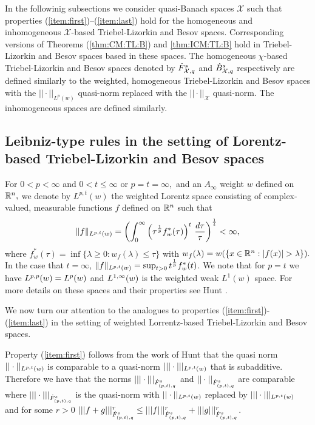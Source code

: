 {In the followinig subsections we consider quasi-Banach spaces $\mathcal{X}$ such that properties (\ref{item:first})--(\ref{item:last}) hold for the homogeneous and inhomogeneous $\mathcal{X}$-based Triebel-Lizorkin and Besov spaces. Corresponding versions of Theorems (\ref{thm:CM:TL:B}) and \ref{thm:ICM:TL:B} hold in Triebel-Lizorkin and Besov spaces based in these spaces. The homogeneous $\chi$-based Triebel-Lizorkin and Besov spaces denoted by $\tl{\mathcal{X}}{s}{q}$ and $\bes{\mathcal{X}}{s}{q}$ respectively are defined similarly to the weighted, homogeneous Triebel-Lizorkin and Besov spaces with the $||\cdot||_{L^p(w)}$ quasi-norm replaced with the $||\cdot||_\mathcal{X}$ quasi-norm. The inhomogeneous spaces are defined similarly. 

 \subsection{Leibniz-type rules in the setting of Lorentz-based Triebel-Lizorkin and Besov spaces}
 For $0<p<\infty$ and $0<t\le \infty$ or $p=t=\infty,$ and an $A_\infty$ weight $w$ defined on $\rn,$  we denote by $L^{p,t}(w)$ the weighted Lorentz space consisting of complex-valued, measurable functions $f$ defined on $\rn$ such that
\[
\|f\|_{\lebw{p,t}{w}}=\left(\int_0^\infty \left(\tau^{\frac{1}{p}} f_w^*(\tau)\right)^t\,\frac{d\tau}{\tau}\right)^{\frac{1}{t}}<\infty,
\]
where $f^*_w(\tau)=\inf\{\lambda\ge 0:w_f(\lambda)\le \tau\}$ with
$w_f(\lambda)=w(\{x\in\rn : \abs{f(x)}>\lambda\}).$ 
In the case that $t=\infty$, $\|f\|_{\lebw{p,t}{w}}= \sup_{t>0}t^{\frac{1}{p}}f_w^*(t)$. We note that for $p=t$ we have $\lebw{p,p}{w} = \lebw{p}{w}$ and $\lebw{1,\infty}{w}$ is the weighted weak $L^1(w)$ space. For more details on these spaces and their properties see Hunt \cite{MR0223874}. 

We now turn our attention to the analogues to properties (\ref{item:first})-(\ref{item:last}) in the setting of weighted Lorrentz-based Triebel-Lizorkin and Besov spaces. 

Property (\ref{item:first}) follows from the work of Hunt \cite{MR0223874} that the quasi norm $||\cdot||_{\lebw{p,t}{w}}$ is comparable to a quasi-norm $|||\cdot|||_{\lebw{p,t}{w}}$ that is subadditive. Therefore we have that the norms $|||\cdot|||_{\tl{(p,t)}{s}{q}}$ and $||\cdot||_{\tl{(p,t)}{s}{q}}$ are comparable where $|||\cdot|||_{\tl{(p,t)}{s}{q}}$ is the quasi-norm with $||\cdot||_{\lebw{p,t}{w}}$ replaced by $|||\cdot|||_{\lebw{p,t}{w}}$ and for some $r>0$ $|||f+g|||^r_{\tl{(p,t)}{s}{q}} \leq |||f|||^r_{\tl{(p,t)}{s}{q}} + |||g|||^r_{\tl{(p,t)}{s}{q}}$. 

}
